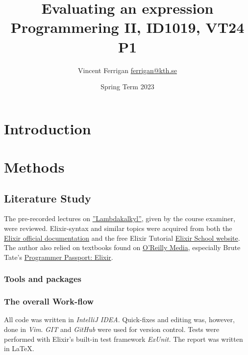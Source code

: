 \documentclass[a4paper,11pt]{article}
\begin{document}
\title{
    Evaluating an expression
\\\small{Programmering II, ID1019, VT24 P1}
}
\author{Vincent Ferrigan \href{mailto:ferrigan@kth.se}{ferrigan@kth.se}}

\date{Spring Term 2023}

\maketitle

\section*{Introduction}
\label{sec:introduction}

\section*{Methods}
\label{sec:methods}

\subsection*{Literature Study}
\label{subsec:literaturestudy}
The pre-recorded lectures on
\href{https://canvas.kth.se/courses/44911/assignments/syllabus}{''Lambdakalkyl''},
given by the course examiner, were reviewed.
Elixir-syntax and similar topics were acquired
from both the
\href{https://elixir-lang.org/docs.html}{Elixir official documentation}
and the free Elixir Tutorial
\href{https://elixirschool.com/en}{Elixir School
website}.
The author also relied on textbooks found on
\href{https://learning.oreilly.com}{O'Reilly Media},
especially Brute Tate's
\href{https://learning.oreilly.com/library/view/programmer-passport-elixir/9781680509649/}{Programmer Passport: Elixir}.

\subsubsection*{Tools and packages}

\label{subsec:tools}
\subsubsection*{The overall Work-flow}
All code was written in \emph{IntelliJ IDEA}.
Quick-fixes and editing was, however, done in \emph{Vim}.
\emph{GIT} and \emph{GitHub} were used for version control.
Tests were performed with Elixir's built-in test framework \emph{ExUnit.}
The report was written in \LaTeX.
\end{document}
